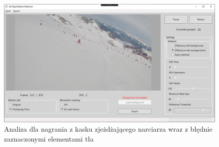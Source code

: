\documentclass[a4paper]{article}
\begin{document}
\begin{figure}[H]
  \includegraphics[width=\linewidth]{resources/img7.png}
  \caption{Analiza dla nagrania z kasku zjeżdżającego narciarza wraz z błędnie zaznaczonymi elementami tła}
\end{figure}
\end{document}
